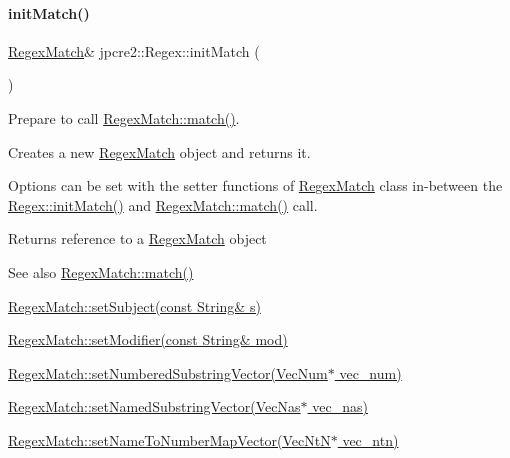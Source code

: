 \paragraph{\texorpdfstring{init\+Match()}{initMatch()}}
{\footnotesize\ttfamily \hyperlink{classjpcre2_1_1RegexMatch}{Regex\+Match}\& jpcre2\+::\+Regex\+::init\+Match (\begin{DoxyParamCaption}{ }\end{DoxyParamCaption})\hspace{0.3cm}{\ttfamily [inline]}}



Prepare to call \hyperlink{classjpcre2_1_1RegexMatch_a5868aef3a146594ea1ebef34d122bb33_a5868aef3a146594ea1ebef34d122bb33}{Regex\+Match\+::match()}. 

Creates a new \hyperlink{classjpcre2_1_1RegexMatch}{Regex\+Match} object and returns it.

Options can be set with the setter functions of \hyperlink{classjpcre2_1_1RegexMatch}{Regex\+Match} class in-\/between the \hyperlink{classjpcre2_1_1Regex_a519b0915bf1163c6ce6a4d674b30cfcd_a519b0915bf1163c6ce6a4d674b30cfcd}{Regex\+::init\+Match()} and \hyperlink{classjpcre2_1_1RegexMatch_a5868aef3a146594ea1ebef34d122bb33_a5868aef3a146594ea1ebef34d122bb33}{Regex\+Match\+::match()} call.

\begin{DoxyReturn}{Returns}
reference to a \hyperlink{classjpcre2_1_1RegexMatch}{Regex\+Match} object 
\end{DoxyReturn}
\begin{DoxySeeAlso}{See also}
\hyperlink{classjpcre2_1_1RegexMatch_a5868aef3a146594ea1ebef34d122bb33_a5868aef3a146594ea1ebef34d122bb33}{Regex\+Match\+::match()} 

\hyperlink{classjpcre2_1_1RegexMatch_a635c652195deaa8ebb9e107c4f972aab_a635c652195deaa8ebb9e107c4f972aab}{Regex\+Match\+::set\+Subject(const String\& s)} 

\hyperlink{classjpcre2_1_1RegexMatch_a9df7e92f96b61553f62720cb8f5f23e5_a9df7e92f96b61553f62720cb8f5f23e5}{Regex\+Match\+::set\+Modifier(const String\& mod)} 

\hyperlink{classjpcre2_1_1RegexMatch_a2c7efe1ec2e13827f670db4ecedcd0a0_a2c7efe1ec2e13827f670db4ecedcd0a0}{Regex\+Match\+::set\+Numbered\+Substring\+Vector(\+Vec\+Num$\ast$ vec\+\_\+num)} 

\hyperlink{classjpcre2_1_1RegexMatch_ae495431f57cae54363331237ab21b56c_ae495431f57cae54363331237ab21b56c}{Regex\+Match\+::set\+Named\+Substring\+Vector(\+Vec\+Nas$\ast$ vec\+\_\+nas)} 

\hyperlink{classjpcre2_1_1RegexMatch_a04926e61d8b5f1d8bdf344efecd567d8_a04926e61d8b5f1d8bdf344efecd567d8}{Regex\+Match\+::set\+Name\+To\+Number\+Map\+Vector(\+Vec\+Nt\+N$\ast$ vec\+\_\+ntn)} 
\end{DoxySeeAlso}
\hypertarget{classjpcre2_1_1Regex_ae7235a991492fa88f1bd3fb02d59cd0a_ae7235a991492fa88f1bd3fb02d59cd0a}{}\label{classjpcre2_1_1Regex_ae7235a991492fa88f1bd3fb02d59cd0a_ae7235a991492fa88f1bd3fb02d59cd0a} 
